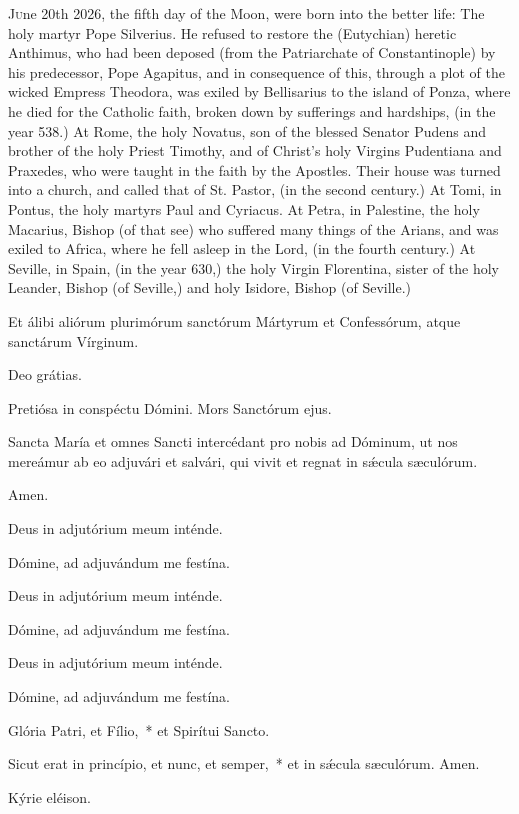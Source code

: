 \begin{enpars}
\lettrine[lraise=0.2]{J}{u}ne 20th 2026, the fifth day of the Moon, were born into the better life:
The holy martyr Pope Silverius. He refused to restore the (Eutychian) heretic Anthimus, who had been deposed (from the Patriarchate of Constantinople) by his predecessor, Pope Agapitus, and in consequence of this, through a plot of the wicked Empress Theodora, was exiled by Bellisarius to the island of Ponza, where he died for the Catholic faith, broken down by sufferings and hardships, (in the year 538.)
At Rome, the holy Novatus, son of the blessed Senator Pudens and brother of the holy Priest Timothy, and of Christ's holy Virgins Pudentiana and Praxedes, who were taught in the faith by the Apostles. Their house was turned into a church, and called that of St. Pastor, (in the second century.)
At Tomi, in Pontus, the holy martyrs Paul and Cyriacus.
At Petra, in Palestine, the holy Macarius, Bishop (of that see) who suffered many things of the Arians, and was exiled to Africa, where he fell asleep in the Lord, (in the fourth century.)
At Seville, in Spain, (in the year 630,) the holy Virgin Florentina, sister of the holy Leander, Bishop (of Seville,) and holy Isidore, Bishop (of Seville.)
\end{enpars}

\vv Et álibi aliórum plurimórum sanctórum Mártyrum et Confessórum, atque sanctárum Vírginum.

\rr Deo grátias.

\vv Pretiósa in conspéctu Dómini. \rr Mors Sanctórum ejus.

Sancta María et omnes Sancti intercédant pro nobis ad Dóminum, ut nos
mereámur ab eo adjuvári et salvári, qui vivit et regnat in sǽcula sæculórum.

\rr Amen.

\vv Deus in adjutórium meum inténde.

\rr Dómine, ad adjuvándum me festína.

\vv Deus in adjutórium meum inténde.

\rr Dómine, ad adjuvándum me festína.

\vv Deus in adjutórium meum inténde.

\rr Dómine, ad adjuvándum me festína.

\vv Glória Patri, et Fílio,~* et Spirítui Sancto.

\rr Sicut erat in princípio, et nunc, et semper,~* et in sǽcula sæculórum. Amen.

\vv Kýrie eléison.

